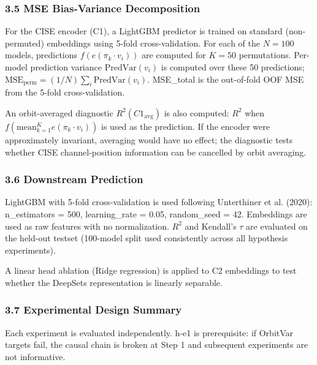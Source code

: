 \subsubsection{3.5 MSE Bias-Variance Decomposition}

For the CISE encoder (C1), a LightGBM predictor is trained on standard (non-permuted) embeddings using 5-fold cross-validation. For each of the $N = 100$ models, predictions $f(e(\pi_k \cdot v_i))$ are computed for $K = 50$ permutations. Per-model prediction variance $\text{PredVar}(v_i)$ is computed over these 50 predictions; $\text{MSE}_\text{perm} = (1/N) \sum_i \text{PredVar}(v_i)$. MSE\_total is the out-of-fold OOF MSE from the 5-fold cross-validation.

An orbit-averaged diagnostic $R^{2}(C1_\text{avg})$ is also computed: $R^2$ when $f(\text{mean}_{k=1}^K e(\pi_k \cdot v_i))$ is used as the prediction. If the encoder were approximately invariant, averaging would have no effect; the diagnostic tests whether CISE channel-position information can be cancelled by orbit averaging.

\subsubsection{3.6 Downstream Prediction}

LightGBM with 5-fold cross-validation is used following Unterthiner et al. (2020): n\_estimators = 500, learning\_rate = 0.05, random\_seed = 42. Embeddings are used as raw features with no normalization. $R^2$ and Kendall's $\tau$ are evaluated on the held-out testset (100-model split used consistently across all hypothesis experiments).

A linear head ablation (Ridge regression) is applied to C2 embeddings to test whether the DeepSets representation is linearly separable.

\subsubsection{3.7 Experimental Design Summary}

\begin{table}[htbp]
\centering
{}
\end{table}

Each experiment is evaluated independently. h-e1 is prerequisite: if OrbitVar targets fail, the causal chain is broken at Step 1 and subsequent experiments are not informative.

